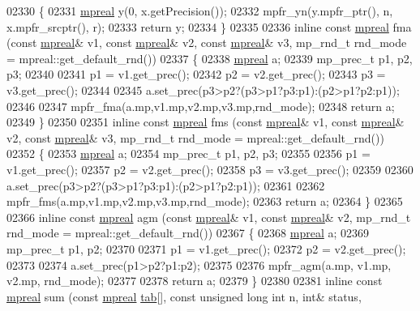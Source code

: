 \begin{DoxyCode}
{{02330 \{
02331     \hyperlink{classmpfr_1_1mpreal}{mpreal}  y(0, x.getPrecision());
02332     mpfr\_yn(y.mpfr\_ptr(), n, x.mpfr\_srcptr(), r);
02333     \textcolor{keywordflow}{return} y;
02334 \}
02335 
02336 \textcolor{keyword}{inline} \textcolor{keyword}{const} \hyperlink{classmpfr_1_1mpreal}{mpreal} fma (\textcolor{keyword}{const} \hyperlink{classmpfr_1_1mpreal}{mpreal}& v1, \textcolor{keyword}{const} \hyperlink{classmpfr_1_1mpreal}{mpreal}& v2, \textcolor{keyword}{const} 
      \hyperlink{classmpfr_1_1mpreal}{mpreal}& v3, mp\_rnd\_t rnd\_mode = mpreal::get\_default\_rnd())
02337 \{
02338     \hyperlink{classmpfr_1_1mpreal}{mpreal} a;
02339     mp\_prec\_t p1, p2, p3;
02340 
02341     p1 = v1.get\_prec();
02342     p2 = v2.get\_prec();
02343     p3 = v3.get\_prec();
02344 
02345     a.set\_prec(p3>p2?(p3>p1?p3:p1):(p2>p1?p2:p1));
02346 
02347     mpfr\_fma(a.mp,v1.mp,v2.mp,v3.mp,rnd\_mode);
02348     \textcolor{keywordflow}{return} a;
02349 \}
02350 
02351 \textcolor{keyword}{inline} \textcolor{keyword}{const} \hyperlink{classmpfr_1_1mpreal}{mpreal} fms (\textcolor{keyword}{const} \hyperlink{classmpfr_1_1mpreal}{mpreal}& v1, \textcolor{keyword}{const} \hyperlink{classmpfr_1_1mpreal}{mpreal}& v2, \textcolor{keyword}{const} 
      \hyperlink{classmpfr_1_1mpreal}{mpreal}& v3, mp\_rnd\_t rnd\_mode = mpreal::get\_default\_rnd())
02352 \{
02353     \hyperlink{classmpfr_1_1mpreal}{mpreal} a;
02354     mp\_prec\_t p1, p2, p3;
02355 
02356     p1 = v1.get\_prec();
02357     p2 = v2.get\_prec();
02358     p3 = v3.get\_prec();
02359 
02360     a.set\_prec(p3>p2?(p3>p1?p3:p1):(p2>p1?p2:p1));
02361 
02362     mpfr\_fms(a.mp,v1.mp,v2.mp,v3.mp,rnd\_mode);
02363     \textcolor{keywordflow}{return} a;
02364 \}
02365 
02366 \textcolor{keyword}{inline} \textcolor{keyword}{const} \hyperlink{classmpfr_1_1mpreal}{mpreal} agm (\textcolor{keyword}{const} \hyperlink{classmpfr_1_1mpreal}{mpreal}& v1, \textcolor{keyword}{const} \hyperlink{classmpfr_1_1mpreal}{mpreal}& v2, mp\_rnd\_t rnd\_mode = 
      mpreal::get\_default\_rnd())
02367 \{
02368     \hyperlink{classmpfr_1_1mpreal}{mpreal} a;
02369     mp\_prec\_t p1, p2;
02370 
02371     p1 = v1.get\_prec();
02372     p2 = v2.get\_prec();
02373 
02374     a.set\_prec(p1>p2?p1:p2);
02375 
02376     mpfr\_agm(a.mp, v1.mp, v2.mp, rnd\_mode);
02377 
02378     \textcolor{keywordflow}{return} a;
02379 \}
02380 
02381 \textcolor{keyword}{inline} \textcolor{keyword}{const} \hyperlink{classmpfr_1_1mpreal}{mpreal} sum (\textcolor{keyword}{const} \hyperlink{classmpfr_1_1mpreal}{mpreal} \hyperlink{structtab}{tab}[], \textcolor{keyword}{const} \textcolor{keywordtype}{unsigned} \textcolor{keywordtype}{long} \textcolor{keywordtype}{int} n, \textcolor{keywordtype}{int}& status, 
}}
\end{DoxyCode}
